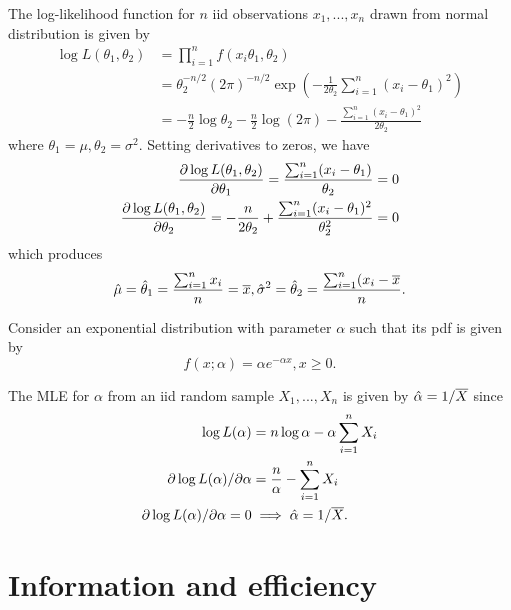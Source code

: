 \begin{refsection}
\begin{example}

The log-likelihood function for $n$ iid observations $x_1,...,x_n$ drawn from normal distribution is given by
\begin{align*}
\log L(\theta_1,\theta_2) &= \prod_{i=1}^n f(x_i\theta_1,\theta_2) \\
						  &= \theta_2^{-n/2}(2\pi)^{-n/2}\exp(-\frac{1}{2\theta_2}\sum_{i=1}^n(x_i - \theta_1)^2) \\
						  &=-\frac{n}{2}\log \theta_2 - \frac{n}{2}\log(2\pi) - \frac{\sum_{i=1}^n (x_i - \theta_1)^2}{2\theta_2}
\end{align*}
where $\theta_1 = \mu, \theta_2 = \sigma^2$. 
Setting derivatives to zeros, we have
\begin{align*}
\frac{\partial \log L(\theta_1,\theta_2)}{\partial \theta_1} = \frac{\sum_{i=1}^n (x_i - \theta_1)}{\theta_2} &= 0 \\
\frac{\partial \log L(\theta_1,\theta_2)}{\partial \theta_2} = -\frac{n}{2\theta_2} + \frac{\sum_{i=1}^n (x_i - \theta_1)^2}{\theta_2^2} &= 0 \\
\end{align*}
which produces
$$\hat{\mu} = \hat{\theta}_1 =\frac{\sum_{i=1}^n x_i}{n} = \overline{x}, \hat{\sigma}^2 = \hat{\theta}_2 =\frac{\sum_{i=1}^n (x_i-\overline{x}}{n}.$$




\end{example}


\begin{example}
	Consider an exponential distribution with parameter $\alpha$ such that its pdf is given by
	$$f(x;\alpha) = \alpha e^{-\alpha x}, x\geq 0.$$
	
 The MLE for $\alpha$ from an iid random sample $X_1,...,X_n$ is given by $\hat{\alpha} = 1/\overline{X}$ since
		\begin{align*}
		\log L(\alpha) &= n\log \alpha - \alpha \sum_{i=1}^n X_i \\
		\partial \log L(\alpha) /\partial \alpha &= \frac{n}{\alpha} - \sum_{i=1}^n X_i \\
		\partial \log L(\alpha) /\partial \alpha = 0 &\implies \hat{\alpha} = 1/\overline{X}.
		\end{align*}
\end{example}
\section{Information and efficiency}


\end{refsection}
